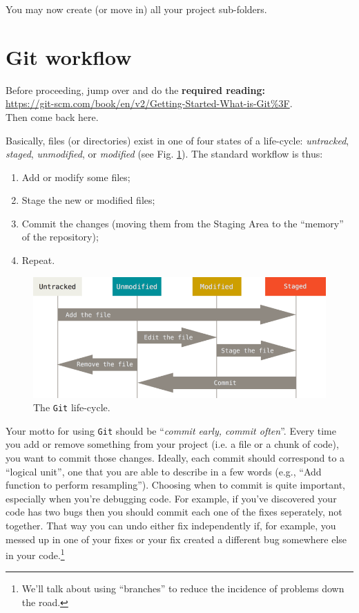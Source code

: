 \documentclass[12pt,letterpaper]{article}
\begin{document}
You may now create (or move in) all your project sub-folders.




\section{Git workflow}
Before proceeding, jump over and do the \textbf{required reading:}\\
\url{https://git-scm.com/book/en/v2/Getting-Started-What-is-Git%3F}.\\
Then come back here.

Basically, files (or directories) exist in one of four states of a life-cycle: \emph{untracked}, \emph{staged}, \emph{unmodified}, or \emph{modified} (see Fig. \ref{fig:lifecycle}).
The standard workflow is thus:
\begin{enumerate}
	\item Add or modify some files;
	\item Stage the new or modified files;
	\item Commit the changes (moving them from the Staging Area to the ``memory'' of the repository);
	\item Repeat.
\end{enumerate}

\begin{figure}
	\includegraphics[width=\linewidth]{figs/lifecycle}
	\caption{The \texttt{Git} life-cycle.}
	\label{fig:lifecycle}
\end{figure}

Your motto for using \texttt{Git} should be ``\emph{commit early, commit often}''.
Every time you add or remove something from your project (i.e. a file or a chunk of code), you want to commit those changes.
Ideally, each commit should correspond to a ``logical unit'', one that you are able to describe in a few words (e.g., ``Add function to perform resampling'').
Choosing when to commit is quite important, especially when you're debugging code.
For example, if you've discovered your code has two bugs then you should commit each one of the fixes seperately, not together.
That way you can undo either fix independently if, for example, you messed up in one of your fixes or your fix created a different bug somewhere else in your code.\footnote{We'll talk about using ``branches'' to reduce the incidence of problems down the road.}
\end{document}
